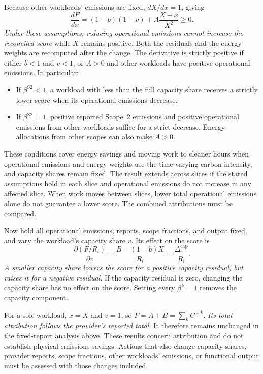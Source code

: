 Because other workloads' emissions are fixed, $dX/dx=1$, giving
\begin{equation}
\frac{dF}{dx}=(1-b)(1-v)+A\frac{X-x}{X^2}\geq0.
\label{eq:operational-incentive-derivative}
\end{equation}
\emph{Under these assumptions, reducing operational emissions cannot increase the reconciled score} while $X$ remains positive.
Both the residuals and the energy weights are recomputed after the change.
The derivative is strictly positive if either $b<1$ and $v<1$, or $A>0$ and other workloads have positive operational emissions.
In particular:
\begin{itemize}
\setlength{\itemsep}{1pt}
\item If $\beta^{\mathrm{S2}}<1$, a workload with less than the full capacity share receives a strictly lower score when its operational emissions decrease.
\item If $\beta^{\mathrm{S2}}=1$, positive reported Scope~2 emissions and positive operational emissions from other workloads suffice for a strict decrease. Energy allocations from other scopes can also make $A>0$.
\end{itemize}
These conditions cover energy savings and moving work to cleaner hours when operational emissions and energy weights use the time-varying carbon intensity, and capacity shares remain fixed.
The result extends across slices if the stated assumptions hold in each slice and operational emissions do not increase in any affected slice.
When work moves between slices, lower total operational emissions alone do not guarantee a lower score. The combined attributions must be compared.

Now hold all operational emissions, reports, scope fractions, and output fixed, and vary the workload's capacity share $v$.
Its effect on the score is
\begin{equation}
\frac{\partial (F/R_i)}{\partial v}=\frac{B-(1-b)X}{R_i}=\frac{\Delta_s^{\mathrm{cap}}}{R_i}.
\end{equation}
\emph{A smaller capacity share lowers the score for a positive capacity residual, but raises it for a negative residual.}
If the capacity residual is zero, changing the capacity share has no effect on the score.
Setting every $\beta^k=1$ removes the capacity component.

For a sole workload, $x=X$ and $v=1$, so $F=A+B=\sum_k C^{\downarrow k}$.
\emph{Its total attribution follows the provider's reported total.}
It therefore remains unchanged in the fixed-report analysis above.
These results concern attribution and do not establish physical emissions savings.
Actions that also change capacity shares, provider reports, scope fractions, other workloads' emissions, or functional output must be assessed with those changes included.
\endgroup
